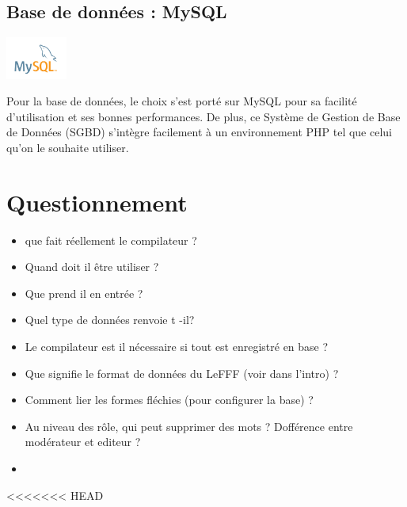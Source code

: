 \documentclass[12pt,a4paper]{article}
\begin{document}
\subsection{Base de données : MySQL}
\begin{center}
  \includegraphics[width=2cm]{img/mysql.png}
\end{center}
Pour la base de données, le choix s'est porté sur MySQL pour sa facilité d'utilisation et ses bonnes performances. 
De plus, ce Système de Gestion de Base de Données (SGBD) s'intègre facilement à un environnement PHP tel que celui qu'on le souhaite utiliser.


\section{Questionnement}
\begin{itemize}  
  \item que fait réellement le compilateur ?
  \item Quand doit il être utiliser ?
  \item Que prend il en entrée ?
  \item Quel type de données renvoie t -il?
  \item Le compilateur est il nécessaire si tout est enregistré en base ?
  \item Que signifie le format de données du LeFFF (voir dans l'intro) ?
  \item Comment lier les formes fléchies (pour configurer la base) ?
  \item Au niveau des rôle, qui peut supprimer des mots ? Dofférence entre modérateur et editeur ?
  \item 
\end{itemize}



<<<<<<< HEAD
\end{document}
